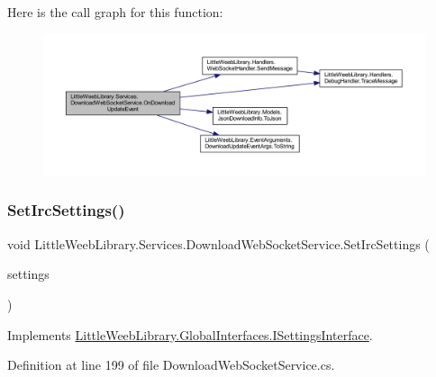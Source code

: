 Here is the call graph for this function\+:\nopagebreak
\begin{figure}[H]
\begin{center}
\leavevmode
\includegraphics[width=350pt]{class_little_weeb_library_1_1_services_1_1_download_web_socket_service_a3111908b7f7a133a80ab6ec3e81cdcbf_cgraph}
\end{center}
\end{figure}
\mbox{\label{class_little_weeb_library_1_1_services_1_1_download_web_socket_service_ac692e2804ac253cc2ceac79d88a2e191}} 
\subsubsection{\texorpdfstring{Set\+Irc\+Settings()}{SetIrcSettings()}}
{\footnotesize\ttfamily void Little\+Weeb\+Library.\+Services.\+Download\+Web\+Socket\+Service.\+Set\+Irc\+Settings (\begin{DoxyParamCaption}\item[{\mbox{\hyperlink{class_little_weeb_library_1_1_settings_1_1_irc_settings}{Irc\+Settings}}}]{settings }\end{DoxyParamCaption})}



Implements \mbox{\hyperlink{interface_little_weeb_library_1_1_global_interfaces_1_1_i_settings_interface_a9ddf06e247a96d757482b37ddb070e3d}{Little\+Weeb\+Library.\+Global\+Interfaces.\+I\+Settings\+Interface}}.



Definition at line 199 of file Download\+Web\+Socket\+Service.\+cs.



